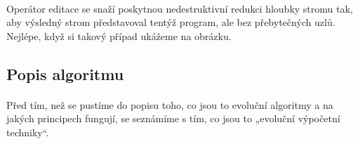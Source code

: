 \documentclass[bc,male,java,dept460]{diploma}		%
\begin{document}
\paragraph*{}
Operátor editace se snaží poskytnou nedestruktivní redukci hloubky stromu tak, aby výsledný strom představoval tentýž program, ale bez přebytečných uzlů. Nejlépe, když si takový případ ukážeme na obrázku.


\subsection{Popis algoritmu}
\paragraph*{}
Před tím, než se pustíme do popisu toho, co jsou to evoluční algoritmy a na jakých principech fungují, se seznámíme s tím, co jsou to „evoluční výpočetní techniky“.
\end{document}
